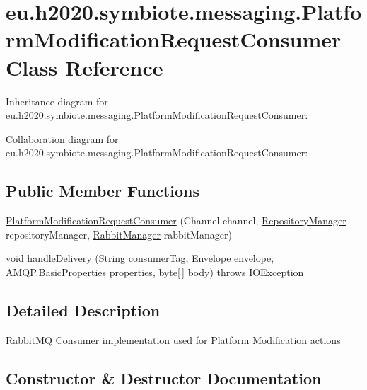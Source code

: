\hypertarget{classeu_1_1h2020_1_1symbiote_1_1messaging_1_1PlatformModificationRequestConsumer}{}\section{eu.\+h2020.\+symbiote.\+messaging.\+Platform\+Modification\+Request\+Consumer Class Reference}
\label{classeu_1_1h2020_1_1symbiote_1_1messaging_1_1PlatformModificationRequestConsumer}


Inheritance diagram for eu.\+h2020.\+symbiote.\+messaging.\+Platform\+Modification\+Request\+Consumer\+:


Collaboration diagram for eu.\+h2020.\+symbiote.\+messaging.\+Platform\+Modification\+Request\+Consumer\+:
\subsection*{Public Member Functions}
\begin{DoxyCompactItemize}
\item 
\hyperlink{classeu_1_1h2020_1_1symbiote_1_1messaging_1_1PlatformModificationRequestConsumer_a68aef30b8dec1bfee5049027aadb0d28}{Platform\+Modification\+Request\+Consumer} (Channel channel, \hyperlink{classeu_1_1h2020_1_1symbiote_1_1repository_1_1RepositoryManager}{Repository\+Manager} repository\+Manager, \hyperlink{classeu_1_1h2020_1_1symbiote_1_1messaging_1_1RabbitManager}{Rabbit\+Manager} rabbit\+Manager)
\item 
void \hyperlink{classeu_1_1h2020_1_1symbiote_1_1messaging_1_1PlatformModificationRequestConsumer_abd849a1e55f280762f4571d4214004a3}{handle\+Delivery} (String consumer\+Tag, Envelope envelope, A\+M\+Q\+P.\+Basic\+Properties properties, byte\mbox{[}$\,$\mbox{]} body)  throws I\+O\+Exception 
\end{DoxyCompactItemize}


\subsection{Detailed Description}
Rabbit\+MQ Consumer implementation used for Platform Modification actions 

\subsection{Constructor \& Destructor Documentation}
